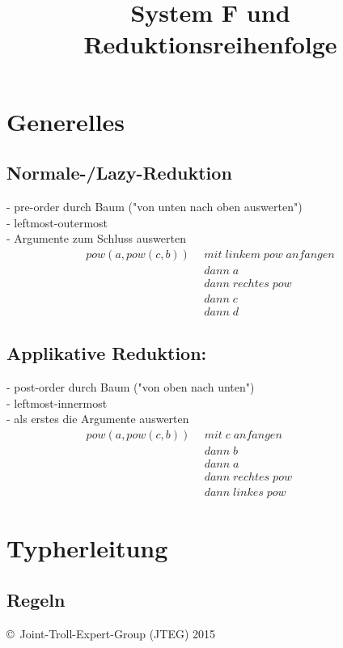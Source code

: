 \documentclass{article}
\title{System F und Reduktionsreihenfolge}
\date{ }
\begin{document}
		\section{Generelles}
		\subsection{Normale-/Lazy-Reduktion}
			- pre-order durch Baum ("von unten nach oben auswerten")	\\
			- leftmost-outermost\\
			- Argumente zum Schluss auswerten
			\begin{align*}			
				pow(a,pow(c,b))\:\:	& mit\;linkem\;pow\;anfangen\\
									& dann\;a\\
									& dann\;rechtes\;pow\\
									& dann\;c\\
									& dann\;d
			\end{align*}
		\subsection{Applikative Reduktion:}
			- post-order durch Baum ("von oben nach unten")\\
			- leftmost-innermost\\
			- als erstes die Argumente auswerten
			\begin{align*}
				pow(a,pow(c,b))\:\: & mit\;c\;anfangen
				\enspace\;\;\;\;\;\;\;\;\;\enspace\;\;\;\;
											\\
									& dann\;b\\
									& dann\;a\\
									& dann\;rechtes\;pow\\
									& dann\;linkes\;pow
			\end{align*}
		\section{Typherleitung}
			\subsection{Regeln}
				
		
		
		
		
		
		
		
		
		
		
		
		
		
		
		
		
		
		
		
		
		
	\begin{tiny}
	\copyright\ Joint-Troll-Expert-Group (JTEG) 2015
	\end{tiny}
\end{document}

